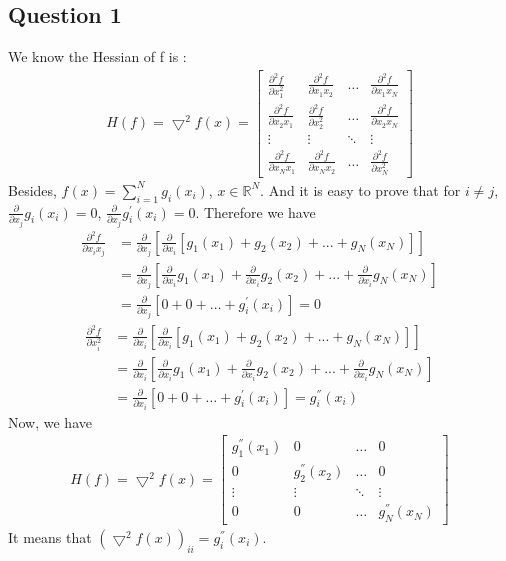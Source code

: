 \documentclass[a4paper,12pt]{article}
\begin{document}
\subsection{Question 1}
We know the Hessian of f is :
\begin{align*}
H(f) = \bigtriangledown^2 f(x) = 
\begin{bmatrix}
\frac{\partial^2 f}{\partial x_1^2} & \frac{\partial^2 f}{\partial x_1x_2} & \hdots & \frac{\partial^2 f}{\partial x_1x_N}\\
\frac{\partial^2 f}{\partial x_2x_1} & \frac{\partial^2 f}{\partial x_2^2} & \hdots & \frac{\partial^2 f}{\partial x_2x_N} \\
\vdots & \vdots & \ddots & \vdots \\ 
\frac{\partial^2 f}{\partial x_Nx_1} & \frac{\partial^2 f}{\partial x_Nx_2} & \hdots & \frac{\partial^2 f}{\partial x_N^2}
\end{bmatrix}
\end{align*}
Besides, $f(x)=\sum^N_{i=1}g_i(x_i)$, $x \in \mathbb{R}^N$. And it is easy to prove that for $i \neq j$, $\frac{\partial}{\partial x_j} g_i(x_i) = 0$, $\frac{\partial}{\partial x_j} g_i^{'}(x_i) = 0$. Therefore we have
\begin{align*}
\frac{\partial^2 f}{\partial x_ix_j} &= \frac{\partial}{\partial x_j}[\frac{\partial}{\partial x_i} [ g_1(x_1)+g_2(x_2)+...+g_N(x_N) ]]\\
&= \frac{\partial}{\partial x_j}[\frac{\partial}{\partial x_i}g_1(x_1)+\frac{\partial}{\partial x_i}g_2(x_2)+...+\frac{\partial}{\partial x_i}g_N(x_N)] \\
&= \frac{\partial}{\partial x_j}[0 + 0 + \dots + g_i^{'}(x_i)] = 0
\end{align*}
\begin{align*}
\frac{\partial^2 f}{\partial x_i^2} &= \frac{\partial}{\partial x_i}[\frac{\partial}{\partial x_i} [ g_1(x_1)+g_2(x_2)+...+g_N(x_N) ]]\\
&= \frac{\partial}{\partial x_i}[\frac{\partial}{\partial x_i}g_1(x_1)+\frac{\partial}{\partial x_i}g_2(x_2)+...+\frac{\partial}{\partial x_i}g_N(x_N)] \\
&= \frac{\partial}{\partial x_i}[0 + 0 + \dots + g_i^{'}(x_i)] = g_i^{''}(x_i)
\end{align*}
Now, we have 
\begin{align*}
H(f) = \bigtriangledown^2 f(x) = 
\begin{bmatrix}
g_1^{''}(x_1) & 0 & \hdots & 0\\
0 & g_2^{''}(x_2) & \hdots & 0 \\
\vdots & \vdots & \ddots & \vdots \\ 
0 & 0 & \hdots & g_N^{''}(x_N)
\end{bmatrix}
\end{align*}
It means that $(\bigtriangledown^2 f(x))_{ii} = g_i^{''}(x_i)$.
\end{document}
